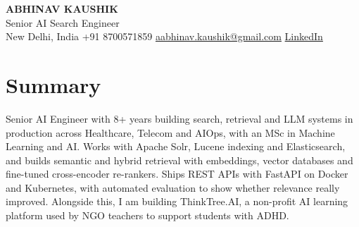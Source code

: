 \documentclass[10pt,a4paper]{article}
\begin{document}
\begin{center}
  {\LARGE\bfseries ABHINAV KAUSHIK}\\[2pt]
  {\large Senior AI Search Engineer}\\[2pt]
  New Delhi, India \textbar{} +91 8700571859 \textbar{} \href{mailto:aabhinav.kaushik@gmail.com}{aabhinav.kaushik@gmail.com} \textbar{} \href{https://www.linkedin.com/in/abhinav-kaushik10/}{LinkedIn}  
\end{center}

\section{Summary}
Senior AI Engineer with 8+ years building search, retrieval and LLM systems in production across Healthcare, Telecom and AIOps, with an MSc in Machine Learning and AI. Works with Apache Solr, Lucene indexing and Elasticsearch, and builds semantic and hybrid retrieval with embeddings, vector databases and fine-tuned cross-encoder re-rankers. Ships REST APIs with FastAPI on Docker and Kubernetes, with automated evaluation to show whether relevance really improved. Alongside this, I am building ThinkTree.AI, a non-profit AI learning platform used by NGO teachers to support students with ADHD.
\end{document}
